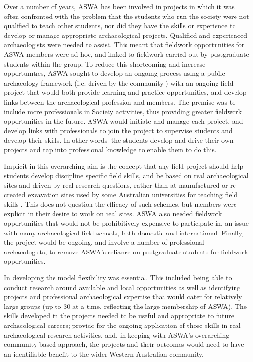 \documentclass[%
]{ijsra}
\begin{document}
	Over a number of years, ASWA has been involved in projects in which it was often confronted with the problem that the students who run the society were not qualified to teach other students, nor did they have the skills or experience to develop or manage appropriate archaeological projects. 
	Qualified and experienced archaeologists were needed to assist. This meant that fieldwork opportunities for ASWA members were ad-hoc, and linked to fieldwork carried out by postgraduate students within the group. 
	To reduce this shortcoming and increase opportunities, ASWA sought to develop an ongoing process using a public archaeology framework (i.e. driven by the community \parencite {faulkner2000}) with an ongoing field project that would both provide learning and practice opportunities, and develop links between the archaeological profession and members. 
	The premise was to include more professionals in Society activities, thus providing greater fieldwork opportunities in the future. 
	ASWA would initiate and manage each project, and develop links with professionals to join the project to supervise students and develop their skills. 
	In other words, the students develop and drive their own projects and tap into professional knowledge to enable them to do this.
	
	Implicit in this overarching aim is the concept that any field project should help students develop discipline specific field skills, and be based on real archaeological sites and driven by real research questions, rather than at manufactured or re-created excavation sites used by some Australian universities for teaching field skills \parencites[e.g.]{cosgrove2013}{hall2005}. 
	This does not question the efficacy of such schemes, but members were explicit in their desire to work on real sites. 
	ASWA also needed fieldwork opportunities that would not be prohibitively expensive to participate in, an issue with many archaeological field schools, both domestic and international. 
	Finally, the project would be ongoing, and involve a number of professional archaeologists, to remove ASWA’s reliance on postgraduate students for fieldwork opportunities.
	
	In developing the model flexibility was essential. This included being able to conduct research around available and local opportunities as well as identifying projects and professional archaeological expertise that would cater for relatively large groups (up to 30 at a time, reflecting the large membership of ASWA). 
	The skills developed in the projects needed to be useful and appropriate to future archaeological careers; provide for the ongoing application of those skills in real archaeological research activities, and, in keeping with ASWA’s overarching community based approach, the projects and their outcomes would need to have an identifiable benefit to the wider Western Australian community.
	
\end{document}
